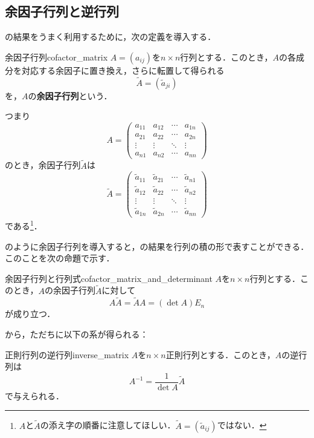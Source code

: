 \subsection{余因子行列と逆行列}

の結果をうまく利用するために，次の定義を導入する．

\begin{definition}{余因子行列}{cofactor_matrix}
  $A = (a_{ij})$を$n \times n$行列とする．このとき，$A$の各成分を対応する余因子に置き換え，さらに転置して得られる
  \[
  \tilde{A} = (\tilde{a}_{ji})
  \]
  を，$A$の\textbf{余因子行列}という．

  つまり
  \[
   A = 
   \begin{pmatrix} 
    a_{11} & a_{12} & \cdots & a_{1n} \\
    a_{21} & a_{22} & \cdots & a_{2n} \\
    \vdots & \vdots & \ddots & \vdots \\
    a_{n1} & a_{n2} & \cdots & a_{nn}
   \end{pmatrix}
  \]
  のとき，余因子行列$\tilde{A}$は
  \[
    \tilde{A} =
    \begin{pmatrix}
    \tilde{a}_{11} & \tilde{a}_{21} & \cdots & \tilde{a}_{n1} \\
    \tilde{a}_{12} & \tilde{a}_{22} & \cdots & \tilde{a}_{n2} \\
    \vdots & \vdots & \ddots & \vdots \\
    \tilde{a}_{1n} & \tilde{a}_{2n} & \cdots & \tilde{a}_{nn}
    \end{pmatrix}
  \]
  である\footnote{$A$と$\tilde{A}$の添え字の順番に注意してほしい．$\tilde{A}=(\tilde{a}_{ij})$ではない．}．
\end{definition}

のように余因子行列を導入すると，の結果を行列の積の形で表すことができる．
このことを次の命題で示す．

\begin{prop}{余因子行列と行列式}{cofactor_matrix_and_determinant}
  $A$を$n \times n$行列とする．このとき，$A$の余因子行列$\tilde{A}$に対して
  \[
  A \tilde{A} = \tilde{A} A = (\det A) E_n
  \]
  が成り立つ．
\end{prop}

から，ただちに以下の系が得られる：

\begin{cor}{正則行列の逆行列}{inverse_matrix}
  $A$を$n \times n$正則行列とする．このとき，$A$の逆行列は
  \[
  A^{-1} = \frac{1}{\det A} \tilde{A}
  \]
  で与えられる．
\end{cor}


